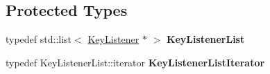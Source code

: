 \subsection*{Protected Types}
\begin{DoxyCompactItemize}
\item 
typedef std\+::list$<$ \hyperlink{classgcn_1_1KeyListener}{Key\+Listener} $\ast$ $>$ {\bfseries Key\+Listener\+List}\hypertarget{classgcn_1_1Gui_a1005100d790e06dafa0a8d338a14f289}{}\label{classgcn_1_1Gui_a1005100d790e06dafa0a8d338a14f289}

\item 
typedef Key\+Listener\+List\+::iterator {\bfseries Key\+Listener\+List\+Iterator}\hypertarget{classgcn_1_1Gui_a0a34fd3c5461fed924e22ccf36508a77}{}\label{classgcn_1_1Gui_a0a34fd3c5461fed924e22ccf36508a77}

\end{DoxyCompactItemize}
